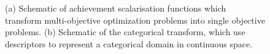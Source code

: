 \begin{figure}
    \caption{(a) Schematic of achievement scalarisation functions which transform multi-objective optimization problems into single objective problems. (b) Schematic of the categorical transform, which use descriptors to represent a categorical domain in continuous space.}
    \label{fig:transforms}
\end{figure}

